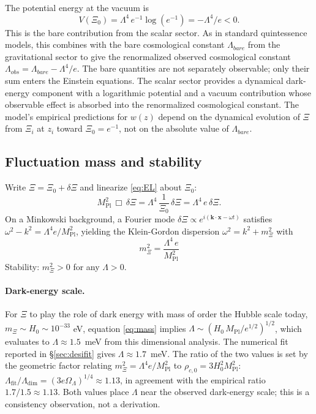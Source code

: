 \documentclass[11pt,reqno]{amsart}
\theoremstyle{plain}
\theoremstyle{definition}
\theoremstyle{remark}
\newcommand{\Pl}{\mathrm{Pl}}
\begin{document}
The potential energy at the vacuum is
\[
  V(\Xi_0) = \Lambda^{4}\,e^{-1} \log(e^{-1}) = -\Lambda^{4}/e < 0.
\]
This is the bare contribution from the scalar sector. As in standard
quintessence models, this combines with the bare cosmological constant
$\Lambda_{bare}$ from the gravitational sector to give the renormalized
observed cosmological constant $\Lambda_{obs} = \Lambda_{bare} - \Lambda^{4}/e$.
The bare quantities are not separately observable; only their sum enters
the Einstein equations. The scalar sector provides a dynamical
dark-energy component with a logarithmic potential and a vacuum
contribution whose observable effect is absorbed into the renormalized
cosmological constant. The model's empirical predictions for $w(z)$
depend on the dynamical evolution of $\Xi$ from $\Xi_i$ at $z_i$ toward
$\Xi_0 = e^{-1}$, not on the absolute value of $\Lambda_{bare}$.

\subsection{Fluctuation mass and stability}

Write $\Xi = \Xi_0 + \delta\Xi$ and linearize \eqref{eq:EL} about $\Xi_0$:
\[
  M_\Pl^{2}\,\Box\,\delta\Xi
  = \Lambda^{4}\,\frac{1}{\Xi_0}\,\delta\Xi
  = \Lambda^{4}\, e\,\delta\Xi.
\]
On a Minkowski background, a Fourier mode $\delta\Xi \propto e^{i(\mathbf{k}\cdot\mathbf{x} - \omega t)}$
satisfies $\omega^{2} - k^{2} = \Lambda^{4} e / M_\Pl^{2}$, yielding the
Klein-Gordon dispersion $\omega^{2} = k^{2} + m_\Xi^{2}$ with
\begin{equation}\label{eq:mass}
  \boxed{\;m_\Xi^{2} = \frac{\Lambda^{4}\,e}{M_\Pl^{2}}\;}
\end{equation}
Stability: $m_\Xi^{2} > 0$ for any $\Lambda > 0$.

\paragraph{Dark-energy scale.}
For $\Xi$ to play the role of dark energy with mass of order the Hubble
scale today, $m_\Xi \sim H_0 \sim 10^{-33}$ eV, equation \eqref{eq:mass}
implies $\Lambda \sim (H_0\, M_\Pl/e^{1/2})^{1/2}$, which evaluates to
$\Lambda \approx 1.5$~meV from this dimensional analysis. The numerical
fit reported in \S\ref{sec:desifit} gives $\Lambda \approx 1.7$~meV. The
ratio of the two values is set by the geometric factor relating
$m_\Xi^{2} = \Lambda^{4}e/M_\Pl^{2}$ to $\rho_{c,0} = 3 H_0^{2}M_\Pl^{2}$:
$\Lambda_\mathrm{fit}/\Lambda_\mathrm{dim} = (3 e \Omega_\Lambda)^{1/4}
\approx 1.13$, in agreement with the empirical ratio $1.7/1.5 \approx 1.13$.
Both values place $\Lambda$ near the observed dark-energy scale; this is
a consistency observation, not a derivation.
\end{document}
